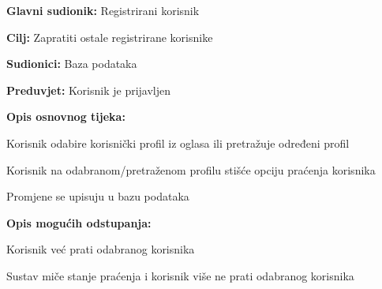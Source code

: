 				\noindent {}
					\begin{packed_item}
	
						\item \textbf{Glavni sudionik: }Registrirani korisnik
						\item  \textbf{Cilj:} Zapratiti ostale registrirane korisnike
						\item  \textbf{Sudionici:} Baza podataka
						\item  \textbf{Preduvjet:} Korisnik je prijavljen
						\item  \textbf{Opis osnovnog tijeka:}
						
						\item[] \begin{packed_enum}
	
							\item Korisnik odabire korisnički profil iz oglasa ili pretražuje određeni profil
							\item Korisnik na odabranom/pretraženom profilu stišće opciju praćenja korisnika
							\item Promjene se upisuju u bazu podataka
							
							\item  \textbf{Opis mogućih odstupanja:}
						
						\item[] \begin{packed_item}
	
							\item[2.a] Korisnik već prati odabranog korisnika
								\begin{packed_item}
									\item Sustav miče stanje praćenja i korisnik više ne prati odabranog korisnika
								\end{packed_item}
						\end{packed_item} 

						\end{packed_enum}						
					\end{packed_item}
		

